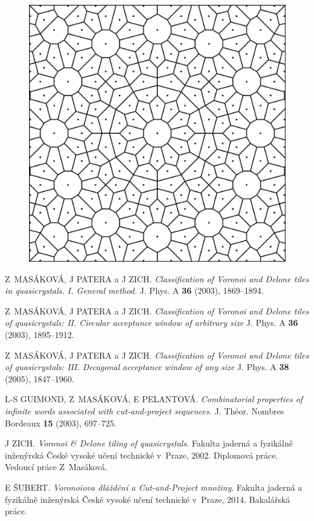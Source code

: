 \documentclass[a4paper,10pt,twoside]{article}
\theoremstyle{definition}
\theoremstyle{remark}
\begin{document}
\begin{figure}[h!]
\centering
\includegraphics[width=\textwidth]{dodecagon}
\end{figure}

\clearpage
\begin{thebibliography}{9}

	Z~MASÁKOVÁ, J PATERA a J ZICH. \emph{Classification of Voronoi and Delone tiles in quasicrystals. I. General method.} J. Phys. A \textbf{36} (2003), 1869--1894.

	Z~MASÁKOVÁ, J PATERA a J ZICH. \emph{Classification of Voronoi and Delone tiles of quasicrystals: II. Circular acceptance window of arbitrary size} J. Phys. A \textbf{36} (2003), 1895--1912.

	Z~MASÁKOVÁ, J PATERA a J ZICH. \emph{Classification of Voronoi and Delone tiles of quasicrystals: III. Decagonal acceptance window of any size} J. Phys. A \textbf{38} (2005), 1847--1960.
  
	L-S GUIMOND, Z~MASÁKOVÁ, E PELANTOVÁ. \emph{Combinatorial properties of infinite words associated with cut-and-project
 sequences.} J. Théor. Nombres Bordeaux \textbf{15} (2003), 697--725.
	
	J ZICH. \emph{Voronoi \& Delone tiling of quasicrystals}. Fakulta jaderná a fyzikálně inženýrská České vysoké učení technické v~Praze, 2002. Diplomová práce. Vedoucí práce Z~Masáková.

	E ŠUBERT. \emph{Voronoiova dláždění a Cut-and-Project množiny}. Fakulta jaderná a fyzikálně inženýrská České vysoké učení technické v~Praze, 2014. Bakalářská práce.
	
\end{thebibliography}
\end{document}
